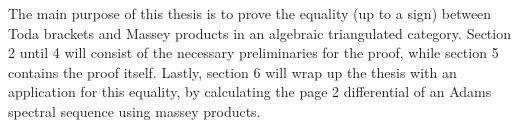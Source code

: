 The main purpose of this thesis is to prove the equality (up to a sign) between Toda brackets and Massey products in an algebraic triangulated category. Section 2 until 4 will consist of the necessary preliminaries for the proof, while section 5 contains the proof itself. Lastly, section 6 will wrap up the thesis with an application for this equality, by calculating the page 2 differential of an Adams spectral sequence using massey products.
